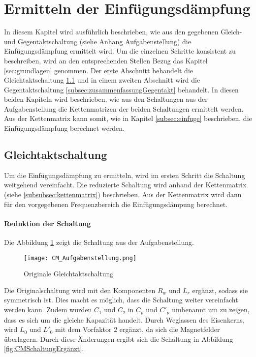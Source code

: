 \section{Ermitteln der Einfügungsdämpfung} \label{sec:umsetzung}
In diesem Kapitel wird ausführlich beschrieben, wie aus den gegebenen Gleich- und Gegentaktschaltung (siehe Anhang Aufgabenstellung) die Einfügungsdämpfung ermittelt wird. Um die einzelnen Schritte konsistent zu beschreiben, wird an den entsprechenden Stellen Bezug das Kapitel \ref{sec:grundlagen} genommen. Der erste Abschnitt behandelt die Gleichtaktschaltung \ref{subsec:zusammenfassungGleichtakt} und in einem zweiten Abschnitt wird die Gegentaktschaltung \ref{subsec:zusammenfassungGegentakt} behandelt. In diesen beiden Kapiteln wird beschrieben, wie aus den Schaltungen aus der Aufgabenstellung die Kettenmatrizen der beiden Schaltungen ermittelt werden. Aus der Kettenmatrix kann somit, wie in Kapitel \ref{subsec:einfuge} beschrieben,  die Einfügungsdämpfung berechnet werden.



\subsection{Gleichtaktschaltung} \label{subsec:zusammenfassungGleichtakt}

Um die Einfügungsdämpfung zu ermitteln, wird im ersten Schritt die Schaltung weitgehend vereinfacht. Die reduzierte Schaltung wird anhand der Kettenmatrix (siehe \ref{subsubsec:kettenmatrix}) beschrieben. Aus der Kettenmatrix wird dann für den vorgegebenen Frequenzbereich die Einfügungsdämpung berechnet.

\bigskip

\paragraph{Reduktion der Schaltung} \label{para:redukGleichtakt}

Die Abbildung \ref{fig:CMSchaltungOriginal} zeigt die Schaltung aus der Aufgabenstellung. 

\begin{figure}[H]
	\centering
	\texttt{[image: CM\_Aufgabenstellung.png]}
	\caption{Originale Gleichtaktschaltung\cite{aufgabenstellung}}
	\label{fig:CMSchaltungOriginal}
\end{figure}

Die Originalschaltung wird mit den Komponenten $R_w$ und $L_r$ ergänzt, sodass sie symmetrisch ist. Dies macht es möglich, dass die Schaltung weiter vereinfacht werden kann. Zudem wurden $C_1$ und $C_2$ in $C_p$ und $C'_p$ umbenannt um zu zeigen, dass es sich um die gleiche Kapazität handelt. Durch Weglassen des Eisenkerns, wird $L_0$ und $L'_0$ mit dem Vorfaktor 2 ergänzt, da sich die Magnetfelder überlagern. Durch diese Änderungen ergibt sich die Schaltung in Abbildung \ref{fig:CMSchaltungErgänzt}.

